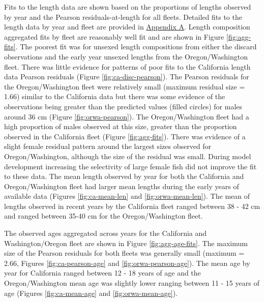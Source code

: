 \documentclass[11pt,
  english,
  a4paper,
]{article}
\begin{document}
Fits to the length data are shown based on the proportions of lengths observed by year and the Pearson residuals-at-length for all fleets. Detailed fits to the length data by year and fleet are provided in {\protect\hyperlink{len-fit-data}{Appendix A}\leavevmode\tagmcend\tagstructend}. Length composition aggregated fits by fleet are reasonably well fit and are shown in Figure \ref{fig:agg-fits}. The poorest fit was for unsexed length compositions from either the discard observations and the early year unsexed lengths from the Oregon/Washington fleet. There was little evidence for patterns of poor fits to the California length data Pearson residuals (Figure \ref{fig:ca-disc-pearson}). The Pearson residuals for the Oregon/Washington fleet were relatively small (maximum residual size = 1.66) similar to the California data but there was some evidence of the observations being greater than the predicted values (filled circles) for males around 36 cm (Figure \ref{fig:orwa-pearson}). The Oregon/Washington fleet had a high proportion of males observed at this size, greater than the proportion observed in the California fleet (Figure \ref{fig:agg-fits}). There was evidence of a slight female residual pattern around the largest sizes observed for Oregon/Washington, although the size of the residual was small. During model development increasing the selectivity of large female fish did not improve the fit to these data. The mean length observed by year for both the California and Oregon/Washington fleet had larger mean lengths during the early years of available data (Figures \ref{fig:ca-mean-len} and \ref{fig:orwa-mean-len}). The mean of lengths observed in recent years by the California fleet ranged between 38 - 42 cm and ranged between 35-40 cm for the Oregon/Washington fleet.

\leavevmode\tagmcend\tagstructend\par


The observed ages aggregated across years for the California and Washington/Oregon fleet are shown in Figure \ref{fig:agg-age-fits}. The maximum size of the Pearson residuals for both fleets was generally small (maximum = 2.66, Figures \ref{fig:ca-pearson-age} and \ref{fig:orwa-pearson-age}). The mean age by year for California ranged between 12 - 18 years of age and the Oregon/Washington mean age was slightly lower ranging between 11 - 15 years of age (Figures \ref{fig:ca-mean-age} and \ref{fig:orwa-mean-age}).
\end{document}
